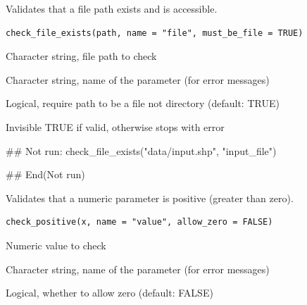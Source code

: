 \documentclass[a4paper]{book}
\begin{document}
%
\begin{Description}\relax
Validates that a file path exists and is accessible.
\end{Description}
%
\begin{Usage}
\begin{verbatim}
check_file_exists(path, name = "file", must_be_file = TRUE)
\end{verbatim}
\end{Usage}
%
\begin{Arguments}
\begin{ldescription}
\item[\code{path}] Character string, file path to check

\item[\code{name}] Character string, name of the parameter (for error messages)

\item[\code{must\_be\_file}] Logical, require path to be a file not directory
(default: TRUE)
\end{ldescription}
\end{Arguments}
%
\begin{Value}
Invisible TRUE if valid, otherwise stops with error
\end{Value}
%
\begin{Examples}
\begin{ExampleCode}
## Not run: 
check_file_exists("data/input.shp", "input_file")

## End(Not run)
\end{ExampleCode}
\end{Examples}
%
\begin{Description}\relax
Validates that a numeric parameter is positive (greater than zero).
\end{Description}
%
\begin{Usage}
\begin{verbatim}
check_positive(x, name = "value", allow_zero = FALSE)
\end{verbatim}
\end{Usage}
%
\begin{Arguments}
\begin{ldescription}
\item[\code{x}] Numeric value to check

\item[\code{name}] Character string, name of the parameter (for error messages)

\item[\code{allow\_zero}] Logical, whether to allow zero (default: FALSE)
\end{ldescription}
\end{Arguments}
\end{document}
